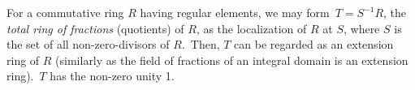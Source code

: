 \documentclass[12pt]{article}
\begin{document}
For a commutative ring $R$ having regular elements, we may form \,$T = S^{-1}R$, the {\em total ring of fractions} (quotients) of $R$, as the localization of $R$ at $S$, where $S$ is the set of all non-zero-divisors of $R$. \,Then, $T$ can be regarded as an extension ring of $R$ (similarly as the field of fractions of an integral domain is an extension ring). \,$T$ has the non-zero unity 1.
\end{document}
